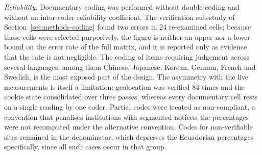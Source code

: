 \documentclass[pdflatex,sn-basic,Numbered,iicol]{sn-jnl}
\theoremstyle{thmstyleone}
\theoremstyle{thmstyletwo}
\theoremstyle{thmstylethree}
\begin{document}
\emph{Reliability.} Documentary coding was performed without double coding and without an inter-coder reliability coefficient. The verification sub-study of Section~\ref{sec:methods-coding} found two errors in 24 re-examined cells; because those cells were selected purposively, the figure is neither an upper nor a lower bound on the error rate of the full matrix, and it is reported only as evidence that the rate is not negligible. The coding of items requiring judgement across several languages, among them Chinese, Japanese, Korean, German, French and Swedish, is the most exposed part of the design. The asymmetry with the live measurements is itself a limitation: geolocation was verified 84 times and the cookie state consolidated over three passes, whereas every documentary cell rests on a single reading by one coder. Partial codes were treated as non-compliant, a convention that penalises institutions with segmented notices; the percentages were not recomputed under the alternative convention. Codes for non-verifiable sites remained in the denominator, which depresses the Ecuadorian percentages specifically, since all such cases occur in that group.
\end{document}
